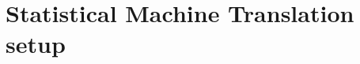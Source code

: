 \documentclass[11pt,letterpaper]{article}
\begin{document}






\section{Statistical Machine Translation setup}
\end{document}
